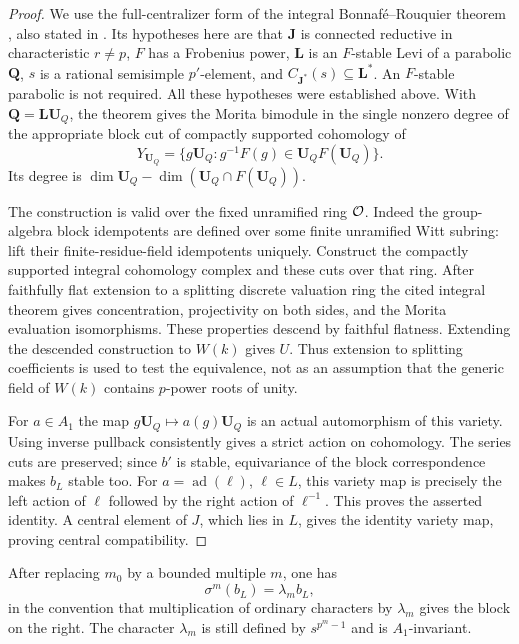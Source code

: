 \begin{proof}
We use the full-centralizer form of the integral
Bonnaf\'e--Rouquier theorem \cite[Theorem~B$'$, \S11.4]{BR}, also
stated in \cite[\S7]{BDR}.  Its hypotheses here are that
$\mathbf J$ is connected reductive in characteristic $r\ne p$,
$F$ has a Frobenius power, $\mathbf L$ is an $F$-stable Levi of a
parabolic $\mathbf Q$, $s$ is a rational semisimple $p'$-element,
and $C_{\mathbf J^*}(s)\subseteq\mathbf L^*$.  An $F$-stable
parabolic is not required.  All these hypotheses were established
above.  With $\mathbf Q=\mathbf L\mathbf U_Q$, the theorem gives
the Morita bimodule in the single nonzero degree of the appropriate
block cut of compactly supported cohomology of
\[
 Y_{\mathbf U_Q}=
 \{g\mathbf U_Q:g^{-1}F(g)\in
                         \mathbf U_QF(\mathbf U_Q)\}.
\]
Its degree is
$\dim\mathbf U_Q-\dim(\mathbf U_Q\cap F(\mathbf U_Q))$.

The construction is valid over the fixed unramified ring $\mathcal O$.
Indeed the group-algebra block idempotents are defined over some
finite unramified Witt subring: lift their finite-residue-field
idempotents uniquely.  Construct the compactly supported integral
cohomology complex and these cuts over that ring.  After faithfully
flat extension to a splitting discrete valuation ring the cited
integral theorem gives concentration, projectivity on both sides,
and the Morita evaluation isomorphisms.  These properties descend
by faithful flatness.  Extending the descended construction to
$W(k)$ gives $U$.  Thus extension to splitting coefficients is used
to test the equivalence, not as an assumption that the generic field
of $W(k)$ contains $p$-power roots of unity.

For $a\in A_1$ the map $g\mathbf U_Q\mapsto a(g)\mathbf U_Q$ is
an actual automorphism of this variety.  Using inverse pullback
consistently gives a strict action on cohomology.  The series cuts
are preserved; since $b'$ is stable, equivariance of the block
correspondence makes $b_L$ stable too.  For $a=\operatorname{ad}(\ell)$,
$\ell\in L$, this variety map is precisely the left action of
$\ell$ followed by the right action of $\ell^{-1}$.  This proves the
asserted identity.  A central element of $J$, which lies in $L$,
gives the identity variety map, proving central compatibility.
\end{proof}

\begin{lemma}\label{per:row-return}
After replacing $m_0$ by a bounded multiple $m$, one has
\begin{equation}\label{per:levi-return}
 \sigma^m(b_L)=\lambda_m b_L,
\end{equation}
in the convention that multiplication of ordinary characters by
$\lambda_m$ gives the block on the right.  The character $\lambda_m$
is still defined by $s^{p^m-1}$ and is $A_1$-invariant.
\end{lemma}

